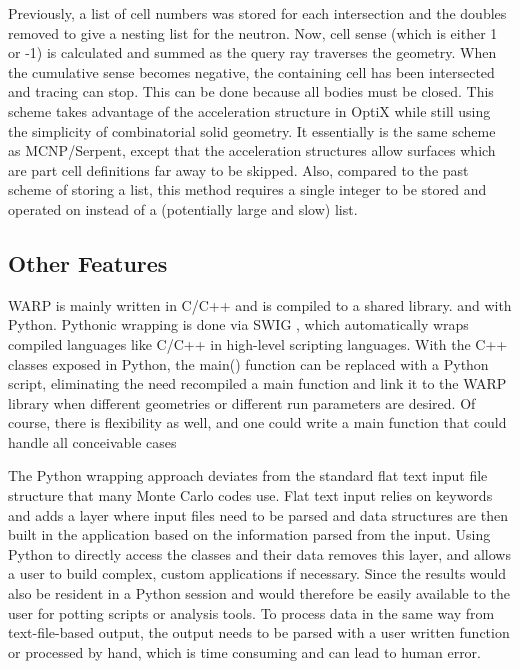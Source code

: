 \documentclass[preprint,12pt]{elsarticle}
\begin{document}
 Previously, a list of cell numbers was stored for each intersection and the doubles removed to give a nesting list for the neutron.  Now, cell sense (which is either 1 or -1) is calculated and summed as the query ray traverses the geometry.  When the cumulative sense becomes negative, the containing cell has been intersected and tracing can stop.  This can be done because all bodies must be closed.  This scheme takes advantage of the acceleration structure in OptiX while still using the simplicity of combinatorial solid geometry.  It essentially is the same scheme as MCNP/Serpent, except that the acceleration structures allow surfaces which are part cell definitions far away to be skipped.  Also, compared to the past scheme of storing a list, this method requires a single integer to be stored and operated on instead of a (potentially large and slow) list.

\subsection{Other Features}

WARP is mainly written in C/C++ and is compiled to a shared library.   and  with Python.  Pythonic wrapping is done via SWIG \cite{swig}, which automatically wraps compiled languages like C/C++ in high-level scripting languages.  With the C++ classes exposed in Python, the main() function can be replaced with a Python script, eliminating the need recompiled a main function and link it to the WARP library when different geometries or different run parameters are desired.  Of course, there is flexibility as well, and one could write a main function that could handle all conceivable cases 

The Python wrapping approach deviates from the standard flat text input file structure that many Monte Carlo codes use.  Flat text input relies on keywords and adds a layer where input files need to be parsed and data structures are then built in the application based on the information parsed from the input.  Using Python to directly access the classes and their data removes this layer, and allows a user to build complex, custom applications if necessary.  Since the results would also be resident in a Python session and would therefore be easily available to the user for potting scripts or analysis tools.  To process data in the same way from text-file-based output, the output needs to be parsed with a user written function or processed by hand, which is time consuming and can lead to human error.
\end{document}
